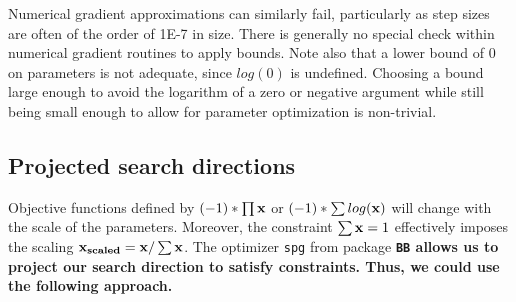 \documentclass[11pt]{article}\usepackage[]{graphicx}\usepackage[]{color}
\newcommand{\B}[1]{{\bf #1 \rm}}
\newcommand{\code}[1]{{\tt#1}}
\newcommand{\pkg}[1]{\bf{\tt#1}\rm }
\begin{document}
Numerical gradient approximations can similarly fail, 
particularly as step sizes are often of the order
of 1E-7 in size. There is generally no special check within numerical 
gradient routines to apply bounds. 
Note also that a lower bound of 0 on parameters is not adequate, 
since $log(0)$ is undefined. Choosing a
bound large enough to avoid the logarithm of a zero or negative argument 
while still being small enough 
to allow for parameter optimization is non-trivial.

\subsection{Projected search directions}

Objective functions defined by $(-1)*\prod{\B{x}}$ or $(-1)*\sum{log(\B{x})}$ will change 
with the scale of the parameters. Moreover, the constraint $\sum{\B{x}}=1$ 
effectively imposes the scaling $\B{x_{scaled}} = \B{x}/\sum{\B{x}}$. The 
optimizer \code{spg} from package \pkg{BB} allows us to project our search 
direction to satisfy constraints. Thus, we could use the following approach.
\end{document}
